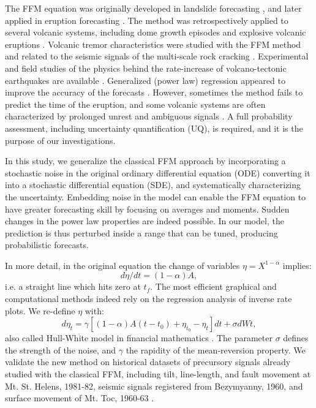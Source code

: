\documentclass{article}
\begin{document}
The FFM equation was originally developed in landslide forecasting \citep{Voight1987, Voight1988b, Voight1989b}, and later applied in eruption forecasting \citep{Voight1988, Voight1989, Cornelius1995}. The method was retrospectively applied to several volcanic systems, including dome growth episodes and explosive volcanic eruptions \citep{Voight1991, Cornelius1994, Cornelius1996, Voight2000}. Volcanic tremor characteristics were studied with the FFM method and related to the seismic signals of the multi-scale rock cracking \citep{Kilburn1998,Ortiz2003,Kilburn2003}. Experimental and field studies of the physics behind the rate-increase of volcano-tectonic earthquakes are available \citep{Smith2009,Smith2010}. Generalized (power law) regression appeared to improve the accuracy of the forecasts \citep{Bell2011}. However, sometimes the method fails to predict the time of the eruption, and some volcanic systems are often characterized by prolonged unrest and ambiguous signals \citep{Chiodini2016}. A full probability assessment, including uncertainty quantification (UQ), is required, and it is the purpose of our investigations.

In this study, we generalize the classical FFM approach by incorporating a stochastic noise in the original  ordinary differential equation (ODE) converting it into a stochastic differential equation (SDE), and systematically characterizing the uncertainty. Embedding noise in the model can enable the FFM equation to have greater forecasting skill by focusing on averages and moments. Sudden changes in the power law properties are indeed possible. In our model, the prediction is thus perturbed inside a range that can be tuned, producing probabilistic forecasts.

In more detail, in the original equation the change of variables $\eta=X^{1-\alpha}$ implies:
$$d\eta/dt=(1-\alpha)A,$$
i.e. a straight line which hits zero at $t_f$. The most efficient graphical and computational methods indeed rely on the regression analysis of inverse rate plots. We re-define $\eta$ with:
$$d\eta_t=\gamma[(1-\alpha)A(t-t_0)+\eta_{t_0}-\eta_t]dt+\sigma dWt,$$
also called Hull-White model in financial mathematics \citep{HullWhite1990}. The parameter $\sigma$ defines the strength of the noise, and $\gamma$ the rapidity of the mean-reversion property. We validate the new method on historical datasets of precursory signals already studied with the classical FFM, including tilt, line-length, and fault movement at Mt. St. Helens, 1981-82, seismic signals registered from Bezymyanny, 1960, and surface movement of Mt. Toc, 1960-63 \citep{Voight1988}.
\end{document}
